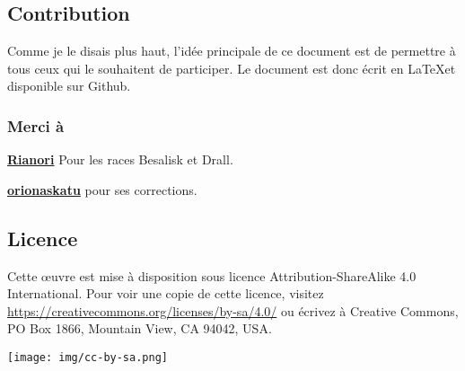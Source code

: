 \subsection{Contribution}
Comme je le disais plus haut, l’idée principale de ce document est de permettre à tous ceux qui le souhaitent de participer. Le document est donc écrit en \LaTeX et disponible sur Github.

\cite{jdrp-starwars} 
\cite{swr-git-repo}

\subsubsection{Merci à}
\begin{rebelist}
	\item \href{https://github.com/Rianori}{\textbf{Rianori}} Pour les races Besalisk et Drall.
	\item \href{https://github.com/orionaskatu}{\textbf{orionaskatu}} pour ses corrections.
\end{rebelist}

\subsection{Licence}
Cette \oe{uvre} est mise à disposition sous licence Attribution-ShareAlike 4.0 International. Pour voir une copie de cette licence, visitez \url{https://creativecommons.org/licenses/by-sa/4.0/} ou écrivez à Creative Commons, PO Box 1866, Mountain View, CA 94042, USA.

\begin{flushright}
	\texttt{[image: img/cc-by-sa.png]}
\end{flushright}

\twocolumn
